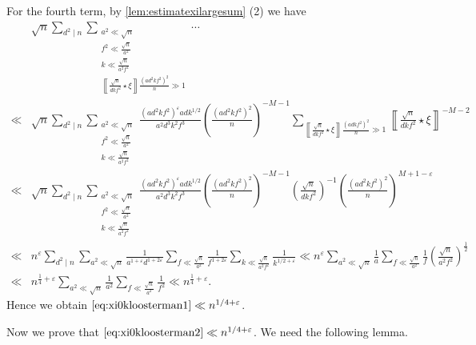 \documentclass[10pt,oneside,reqno]{amsart}
\makeatletter
\theoremstyle{THEOREM}
\theoremstyle{DEFINITION}
\theoremstyle{EXERCISE}
\numberwithin{equation}{section}
\renewenvironment{proof}[1][\proofname]{\par
  \vspace{-6pt}
  \pushQED{\qed}
  \normalfont \topsep6\p@\@plus6\p@\relax
  \trivlist
  \item[\hskip\labelsep\rmfamily\bfseries
    #1\@addpunct{:}]\ignorespaces
}{
  \popQED\endtrivlist\@endpefalse
  \vspace{-6pt}
}
\makeatother
\begin{document}
\begin{proof}
For the fourth term, by \autoref{lem:estimatexilargesum} (2) we have
\begin{align*}
&\sqrt{n}\sum_{d^2\mid n}\sum_{\substack{a^2\ll \sqrt {n}\\ f^2\ll \frac{\sqrt{n}}{a^2}\\k\ll \frac{\sqrt{n}}{a^2f^2}\\\left\llbracket\frac{\sqrt{n}}{dkf^2}\star \xi\right\rrbracket\frac {(ad^2kf^2)^2}{n} \gg 1}}\cdots\\
\ll &\sqrt{n}\sum_{d^2\mid n}\sum_{\substack{a^2\ll \sqrt {n}\\ f^2\ll \frac{\sqrt{n}}{a^2}\\k\ll \frac{\sqrt{n}}{a^2f^2}}}\frac{(ad^2kf^2)^\varepsilon adk^{1/2}}{a^2d^3k^2f^3} \left(\frac{(ad^2kf^2)^2}{n} \right)^{-M-1} \sum_{\left\llbracket\frac{\sqrt{n}}{dkf^2}\star \xi\right\rrbracket\frac{(adkf^2)^2}{n} \gg 1}\left\llbracket\frac{\sqrt{n}}{dkf^2}\star \xi\right\rrbracket^{-M-2}\\
\ll &\sqrt{n}\sum_{d^2\mid n}\sum_{\substack{a^2\ll \sqrt {n}\\ f^2\ll \frac{\sqrt{n}}{a^2}\\k\ll \frac{\sqrt{n}}{a^2f^2}}}\frac{(ad^2kf^2)^{\varepsilon}adk^{1/2}}{a^2d^3k^2f^3} \left(\frac{(ad^2kf^2)^2}{n} \right)^{-M-1} \left(\frac{\sqrt{n}}{dkf^2}\right)^{-1}\left(\frac{(ad^2kf^2)^2}{n} \right)^{M+1-\varepsilon}\\
\ll &n^{\varepsilon}\sum_{d^2\mid n}\sum_{a^2\ll \sqrt{n}}\frac{1}{a^{1+\varepsilon}d^{1+2\varepsilon}}\sum_{f\ll \frac{\sqrt{n}}{a^2}}\frac{1}{f^{1+2\varepsilon}}\sum_{k\ll \frac{\sqrt{n}}{a^2f^2}}\frac{1}{k^{1/2+\varepsilon}}\ll n^{\varepsilon}\sum_{a^2\ll \sqrt{n}}\frac{1}{a}\sum_{f\ll \frac{\sqrt{n}}{a^2}}\frac{1}{f}\left(\frac{\sqrt{n}}{a^2f^2} \right)^{\frac12} \\ \ll &n^{\frac14+\varepsilon}\sum_{a^2\ll \sqrt{n}}\frac{1}{a^2}\sum_{f\ll \frac{\sqrt{n}}{a^2}}\frac{1}{f^2}\ll  n^{\frac14+\varepsilon}.
\end{align*}
Hence we obtain $\eqref{eq:xi0kloosterman1}\ll n^{1/4+\varepsilon}$.
\end{proof}

Now we prove that $\eqref{eq:xi0kloosterman2}\ll n^{1/4+\varepsilon}$. We need the following lemma.
\end{document}
